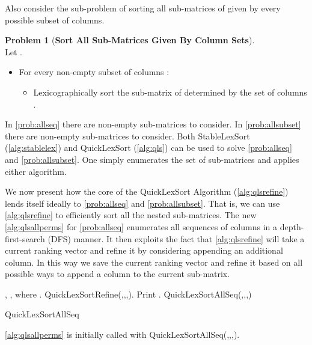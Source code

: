 \documentclass[a4paper,10pt,reqno]{amsart}
\theoremstyle{definition}
\newtheorem{problem}{Problem}
\begin{document}
Also consider the sub-problem of sorting all sub-matrices of 
 given by every possible subset of columns.

\begin{problem}[\bf Sort All Sub-Matrices Given By Column Sets]  \\
Let . 
\begin{itemize}
    \item For every non-empty subset of columns :
    \begin{itemize}
        \item Lexicographically sort the sub-matrix of  determined by the set of columns .
    \end{itemize}
    \label{prob:allsubset}
\end{itemize}
\end{problem}

In \autoref{prob:allseq} there are  non-empty
sub-matrices to consider.  In \autoref{prob:allsubset} there are 
non-empty sub-matrices to consider. Both StableLexSort (\autoref{alg:stablelex})
and QuickLexSort (\autoref{alg:qls}) can be used to solve \autoref{prob:allseq}
and \autoref{prob:allsubset}. One simply enumerates the set of sub-matrices and
applies either algorithm.

We now present how the core of the QuickLexSort Algorithm
(\autoref{alg:qlsrefine}) lends itself ideally to \autoref{prob:allseq} and
\autoref{prob:allsubset}. That is, we can use \autoref{alg:qlsrefine} to
efficiently sort all the nested sub-matrices. The new \autoref{alg:qlsallperms}
for \autoref{prob:allseq} enumerates all sequences of columns in a
depth-first-search (DFS) manner.  It then exploits the fact that
\autoref{alg:qlsrefine} will take a current ranking vector and refine it by
considering appending an additional column. In this way we save the current
ranking vector and refine it based on all possible ways to append a column to
the current sub-matrix. 

\begin{algorithm}
\begin{algorithmic}[1]
    \REQUIRE , ,  where  .
\FOR{ }
        \STATE QuickLexSortRefine(,,,).
        \STATE Print .
        \STATE QuickLexSortAllSeq(,,,)
    \ENDFOR
\end{algorithmic}
\caption{QuickLexSortAllSeq}
\label{alg:qlsallperms}
\end{algorithm}

\autoref{alg:qlsallperms} is initially called with QuickLexSortAllSeq(,,,).
\end{document}
